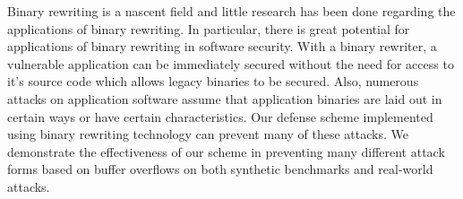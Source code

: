 Binary rewriting is a nascent field and little research has been done regarding the applications of
binary rewriting. In particular, there is great potential for applications of binary rewriting in
software security. With a binary rewriter, a vulnerable application can be immediately secured
without the need for access to it's source code which allows legacy binaries to be secured. Also,
numerous attacks on application software assume that application binaries are laid out in certain
ways or have certain characteristics. Our defense scheme implemented using binary rewriting
technology can prevent many of these attacks. We demonstrate the effectiveness of our scheme in
preventing many different attack forms based on buffer overflows on both synthetic benchmarks and
real-world attacks.
